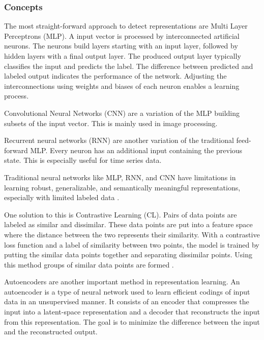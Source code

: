 \subsubsection{Concepts}
The most straight-forward approach to detect representations are Multi Layer Perceptrons (MLP). A input vector is processed by interconnected artificial neurons. The neurons build layers starting with an input layer, followed by hidden layers with a final output layer. The produced output layer typically classifies the input and predicts the label. The difference between predicted and labeled output indicates the performance of the network. Adjusting the interconnections using weights and biases of each neuron enables a learning process. 

Convolutional Neural Networks (CNN) are a variation of the MLP building subsets of the input vector. This is mainly used in image processing.

Recurrent neural networks (RNN) are another variation of the traditional feed-forward MLP. Every neuron has an additional input containing the previous state. This is especially useful for time series data.

Traditional neural networks like MLP, RNN, and CNN have limitations in learning robust, generalizable, and semantically meaningful representations, especially with limited labeled data . 

One solution to this is Contrastive Learning (CL). Pairs of data points are labeled as similar and dissimilar. These data points are put into a feature space where the distance between the two represents their similarity. With a contrastive loss function and a label of similarity between two points, the model is trained by putting the similar data points together and separating dissimilar points. Using this method groups of similar data points are formed .

Autoencoders are another important method in representation learning. An autoencoder is a type of neural network used to learn efficient codings of input data in an unsupervised manner. It consists of an encoder that compresses the input into a latent-space representation and a decoder that reconstructs the input from this representation. The goal is to minimize the difference between the input and the reconstructed output.


